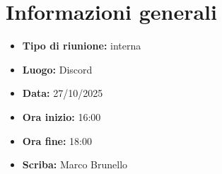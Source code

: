 \section{Informazioni generali}

\begin{itemize}
    \item \textbf{Tipo di riunione:} interna
    \item \textbf{Luogo:} Discord
    \item \textbf{Data:} 27/10/2025
    \item \textbf{Ora inizio:} 16:00
    \item \textbf{Ora fine:} 18:00
    \item \textbf{Scriba:} Marco Brunello
\end{itemize}